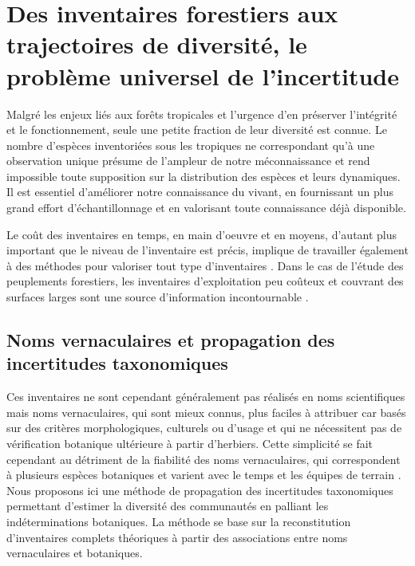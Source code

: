 \documentclass[
  11pt,
  french,
  A4paper,
  extrafontsizes,onecolumn,openright
  ]{memoir}
\begin{document}
\chapter{Des inventaires forestiers aux trajectoires de diversité, le
problème universel de
l'incertitude}\label{des-inventaires-forestiers-aux-trajectoires-de-diversite-le-probleme-universel-de-lincertitude}

Malgré les enjeux liés aux forêts tropicales et l'urgence d'en préserver
l'intégrité et le fonctionnement, seule une petite fraction de leur
diversité est connue. Le nombre d'espèces inventoriées sous les
tropiques ne correspondant qu'à une observation unique
\autocite{Feeley2011} présume de l'ampleur de notre méconnaissance et
rend impossible toute supposition sur la distribution des espèces et
leurs dynamiques. Il est essentiel d'améliorer notre connaissance du
vivant, en fournissant un plus grand effort d'échantillonnage et en
valorisant toute connaissance déjà disponible.

Le coût des inventaires en temps, en main d'oeuvre et en moyens,
d'autant plus important que le niveau de l'inventaire est précis,
implique de travailler également à des méthodes pour valoriser tout type
d'inventaires \autocite{Baraloto2012}. Dans le cas de l'étude des
peuplements forestiers, les inventaires d'exploitation peu coûteux et
couvrant des surfaces larges sont une source d'information
incontournable \autocites{terSteege2000}{Guitet2014}.

\section{Noms vernaculaires et propagation des incertitudes
taxonomiques}\label{noms-vernaculaires-et-propagation-des-incertitudes-taxonomiques}

Ces inventaires ne sont cependant généralement pas réalisés en noms
scientifiques mais noms vernaculaires, qui sont mieux connus, plus
faciles à attribuer car basés sur des critères morphologiques, culturels
ou d'usage et qui ne nécessitent pas de vérification botanique
ultérieure à partir d'herbiers. Cette simplicité se fait cependant au
détriment de la fiabilité des noms vernaculaires, qui correspondent à
plusieurs espèces botaniques et varient avec le temps et les équipes de
terrain \autocite{Oldeman1968}. Nous proposons ici une méthode de
propagation des incertitudes taxonomiques permettant d'estimer la
diversité des communautés en palliant les indéterminations botaniques.
La méthode se base sur la reconstitution d'inventaires complets
théoriques à partir des associations entre noms vernaculaires et
botaniques.
\end{document}
